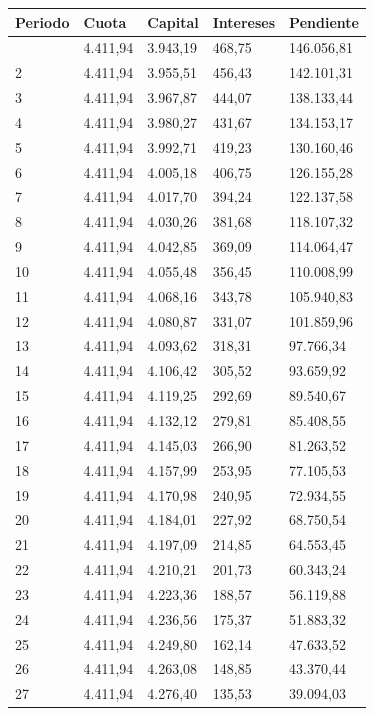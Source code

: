 \documentclass[
  letterpaper,
  DIV=11,
  numbers=noendperiod]{scrartcl}
\begin{document}
\begin{tcolorbox}
\begin{longtable}[]{@{}lllll@{}}
\toprule\noalign{}
Periodo & Cuota & Capital & Intereses & Pendiente \\
\midrule\noalign{}
\endhead
\bottomrule\noalign{}
\endlastfoot
1 & 4.411,94 & 3.943,19 & 468,75 & 146.056,81 \\
2 & 4.411,94 & 3.955,51 & 456,43 & 142.101,31 \\
3 & 4.411,94 & 3.967,87 & 444,07 & 138.133,44 \\
4 & 4.411,94 & 3.980,27 & 431,67 & 134.153,17 \\
5 & 4.411,94 & 3.992,71 & 419,23 & 130.160,46 \\
6 & 4.411,94 & 4.005,18 & 406,75 & 126.155,28 \\
7 & 4.411,94 & 4.017,70 & 394,24 & 122.137,58 \\
8 & 4.411,94 & 4.030,26 & 381,68 & 118.107,32 \\
9 & 4.411,94 & 4.042,85 & 369,09 & 114.064,47 \\
10 & 4.411,94 & 4.055,48 & 356,45 & 110.008,99 \\
11 & 4.411,94 & 4.068,16 & 343,78 & 105.940,83 \\
12 & 4.411,94 & 4.080,87 & 331,07 & 101.859,96 \\
13 & 4.411,94 & 4.093,62 & 318,31 & 97.766,34 \\
14 & 4.411,94 & 4.106,42 & 305,52 & 93.659,92 \\
15 & 4.411,94 & 4.119,25 & 292,69 & 89.540,67 \\
16 & 4.411,94 & 4.132,12 & 279,81 & 85.408,55 \\
17 & 4.411,94 & 4.145,03 & 266,90 & 81.263,52 \\
18 & 4.411,94 & 4.157,99 & 253,95 & 77.105,53 \\
19 & 4.411,94 & 4.170,98 & 240,95 & 72.934,55 \\
20 & 4.411,94 & 4.184,01 & 227,92 & 68.750,54 \\
21 & 4.411,94 & 4.197,09 & 214,85 & 64.553,45 \\
22 & 4.411,94 & 4.210,21 & 201,73 & 60.343,24 \\
23 & 4.411,94 & 4.223,36 & 188,57 & 56.119,88 \\
24 & 4.411,94 & 4.236,56 & 175,37 & 51.883,32 \\
25 & 4.411,94 & 4.249,80 & 162,14 & 47.633,52 \\
26 & 4.411,94 & 4.263,08 & 148,85 & 43.370,44 \\
27 & 4.411,94 & 4.276,40 & 135,53 & 39.094,03 \\

\end{longtable}
\end{tcolorbox}
\end{document}
